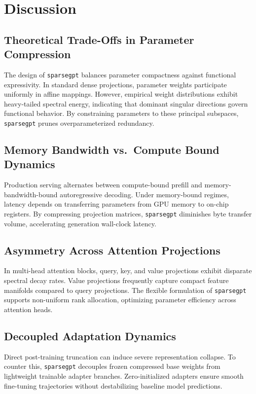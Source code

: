 \section{Discussion}

\subsection{Theoretical Trade-Offs in Parameter Compression}
The design of \texttt{sparsegpt} balances parameter compactness against functional expressivity. In standard dense projections, parameter weights participate uniformly in affine mappings. However, empirical weight distributions exhibit heavy-tailed spectral energy, indicating that dominant singular directions govern functional behavior. By constraining parameters to these principal subspaces, \texttt{sparsegpt} prunes overparameterized redundancy.

\subsection{Memory Bandwidth vs.\ Compute Bound Dynamics}
Production serving alternates between compute-bound prefill and memory-bandwidth-bound autoregressive decoding. Under memory-bound regimes, latency depends on transferring parameters from GPU memory to on-chip registers. By compressing projection matrices, \texttt{sparsegpt} diminishes byte transfer volume, accelerating generation wall-clock latency.

\subsection{Asymmetry Across Attention Projections}
In multi-head attention blocks, query, key, and value projections exhibit disparate spectral decay rates. Value projections frequently capture compact feature manifolds compared to query projections. The flexible formulation of \texttt{sparsegpt} supports non-uniform rank allocation, optimizing parameter efficiency across attention heads.

\subsection{Decoupled Adaptation Dynamics}
Direct post-training truncation can induce severe representation collapse. To counter this, \texttt{sparsegpt} decouples frozen compressed base weights from lightweight trainable adapter branches. Zero-initialized adapters ensure smooth fine-tuning trajectories without destabilizing baseline model predictions.

